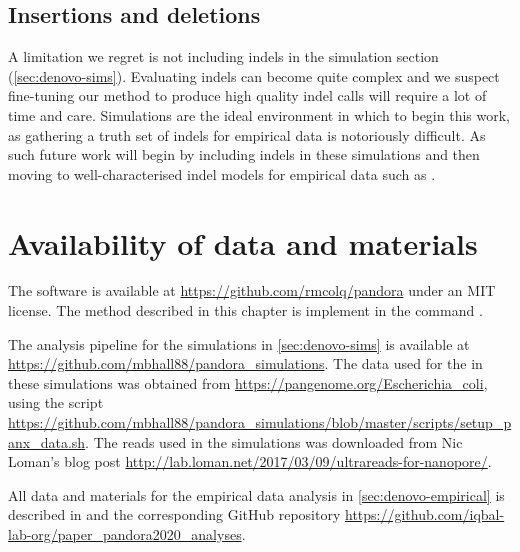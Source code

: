 \subsection{Insertions and deletions}

A limitation we regret is not including indels in the simulation section (\autoref{sec:denovo-sims}). Evaluating indels can become quite complex and we suspect fine-tuning our method to produce high quality indel calls will require a lot of time and care. Simulations are the ideal environment in which to begin this work, as gathering a truth set of indels for empirical data is notoriously difficult. As such future work will begin by including indels in these simulations and then moving to well-characterised indel models for empirical data such as \cite{Bush2021}.

\section{Availability of data and materials}

The \pandora{} software is available at \url{https://github.com/rmcolq/pandora} under an MIT license. The \denovo{} method described in this chapter is implement in the command \pandora{} .

The analysis pipeline for the simulations in \autoref{sec:denovo-sims} is available at \url{https://github.com/mbhall88/pandora_simulations}. The data used for the \panrg{} in these simulations was obtained from \url{https://pangenome.org/Escherichia_coli}, using the script \url{https://github.com/mbhall88/pandora_simulations/blob/master/scripts/setup_panx_data.sh}. The \ont{} reads used in the simulations was downloaded from Nic Loman's blog post \url{http://lab.loman.net/2017/03/09/ultrareads-for-nanopore/}.

All data and materials for the empirical data analysis in \autoref{sec:denovo-empirical} is described in \cite{pandora} and the corresponding GitHub repository \url{https://github.com/iqbal-lab-org/paper_pandora2020_analyses}.